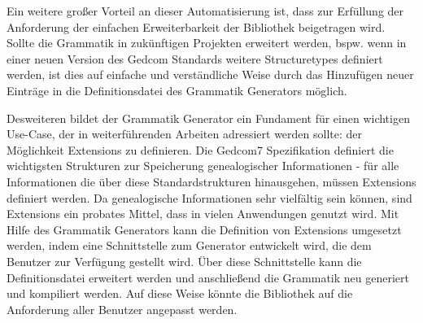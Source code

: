 Ein weitere großer Vorteil an dieser Automatisierung ist, dass zur Erfüllung der Anforderung der einfachen Erweiterbarkeit der Bibliothek beigetragen wird. Sollte die Grammatik in zukünftigen Projekten erweitert werden, bspw. wenn in einer neuen Version des Gedcom Standards weitere Structuretypes definiert werden, ist dies auf einfache und verständliche Weise durch das Hinzufügen neuer Einträge in die Definitionsdatei des Grammatik Generators möglich. 


Desweiteren bildet der Grammatik Generator ein Fundament für einen wichtigen Use-Case, der in weiterführenden Arbeiten adressiert werden sollte: der Möglichkeit Extensions zu definieren. Die Gedcom7 Spezifikation definiert die wichtigsten Strukturen zur Speicherung genealogischer Informationen - für alle Informationen die über diese Standardstrukturen hinausgehen, müssen Extensions definiert werden. Da genealogische Informationen sehr vielfältig sein können, sind Extensions ein probates Mittel, dass in vielen Anwendungen genutzt wird. Mit Hilfe des Grammatik Generators kann die Definition von Extensions umgesetzt werden, indem eine Schnittstelle zum Generator entwickelt wird, die dem Benutzer zur Verfügung gestellt wird. Über diese Schnittstelle kann die Definitionsdatei erweitert werden und anschließend die Grammatik neu generiert und kompiliert werden. Auf diese Weise könnte die Bibliothek auf die Anforderung aller Benutzer angepasst werden. 
